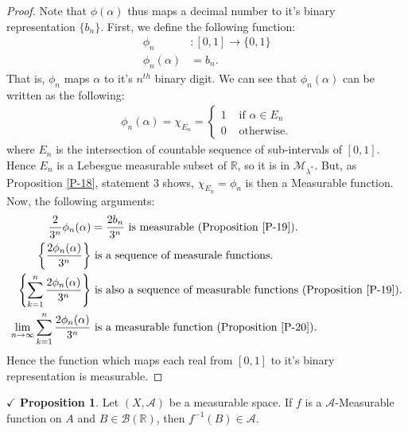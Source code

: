 \documentclass{article}
\theoremstyle{definition}
\theoremstyle{remark}
\theoremstyle{definition}
\theoremstyle{definition}
\newtheorem{proposition}{$\checkmark$ Proposition}
\theoremstyle{definition}
\newcommand{\R}{\mathbb{R}}
\newcommand{\alg}[1]{\mathscr{#1}}
\newcommand{\bor}[1]{\mathscr{B}(#1)}
\newcommand{\set}[1]{\mathscr{#1}}
\newcommand{\msigm}[1]{\set{M}_{#1}}
\newcommand{\inv}[1]{{#1}^{-1}}
\begin{document}
\begin{proof}
	Note that $ \phi(\alpha) $ thus maps a decimal number to it's binary representation $ \{b_n\} $. First, we define the following function:
	\begin{equation*}
		\begin{split}
			\phi_n &: [0,1]\longrightarrow \{0,1\}\\
			\phi_n(\alpha) &= b_n. 
		\end{split}
	\end{equation*}
That is, $ \phi_n $ maps $ \alpha $ to it's $ n^{th} $ binary digit. We can see that $ \phi_n(\alpha) $ can be written as the following:
\begin{equation*}
	\begin{split}
		\phi_n(\alpha) = \chi_{E_n} = \begin{cases}
			1&\text{ if }  \alpha \in E_n \\
			0&\text{ otherwise.}
		\end{cases}
	\end{split}
\end{equation*}
where $ E_n $ is the intersection of countable sequence of sub-intervals of $ [0,1] $. Hence $ E_n $ is a Lebesgue measurable subset of $ \R $, so it is in $ \msigm{\lambda^*} $. But, as Proposition \ref{P-18}, statement 3 shows, $ \chi_{E_n} = \phi_n $ is then a Measurable function.\\
Now, the following arguments:
\begin{equation*}
	\begin{split}
		\frac{2}{3^n} \phi_n(\alpha) &= \frac{2b_n}{3^{n}} \text{ is measurable (Proposition \ref{P-19}).}\\
		\left \{\frac{2\phi_n(\alpha)}{3^n}\right \}&\text{ is a sequence of measurale functions.}\\
		\left \{\sum_{k=1}^{n} \frac{2\phi_n(\alpha)}{3^n}\right \}&\text{ is also a sequence of measurable functions (Proposition \ref{P-19}).}\\
		\lim_{n\to \infty} \sum_{k=1}^{n} \frac{2\phi_n(\alpha)}{3^n}&\text{ is a measurable function (Proposition \ref{P-20}).}
	\end{split}
\end{equation*} 
Hence the function which maps each real from $ [0,1] $ to it's binary representation is measurable.
\end{proof}
\hrulefill
\begin{proposition}\label{P-24}
	Let $ (X,\alg{A}) $ be a measurable space. If $ f $ is a $ \alg{A} $-Measurable function on $ A $ and $ B\in \bor{\R} $, then $ \inv{f}(B) \in \alg{A}$.
\end{proposition}
\end{document}
